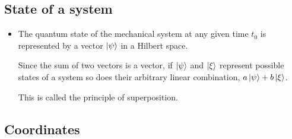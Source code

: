 \documentclass[11pt]{article}
\numberwithin{equation}{section}
\begin{document}
\subsection{State of a system}
\begin{itemize}
    \item The quantum state of the mechanical system at any given time  $t_0$ is represented by a vector $\ket{\psi}$ in a Hilbert space. 

Since the sum of two vectors is a vector, if $\ket{\psi}$ and $\ket{\xi}$ represent possible states of a system so does their arbitrary linear combination, $a \ket{\psi}+ b\ket{\xi}$.

This is called the principle of superposition. 
\end{itemize}

\subsection{Coordinates}
\end{document}
